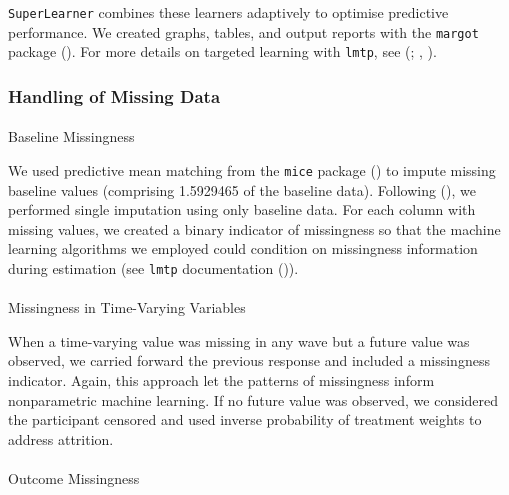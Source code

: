 \documentclass[
  single column]{article}
\makeatletter
\let\oldparagraph\paragraph
\renewcommand{\paragraph}{
    \@ifstar
      \xxxParagraphStar
      \xxxParagraphNoStar
  }
\newcommand{\xxxParagraphStar}[1]{\oldparagraph*{#1}\mbox{}}
\newcommand{\xxxParagraphNoStar}[1]{\oldparagraph{#1}\mbox{}}
\makeatother
\begin{document}
\texttt{SuperLearner} combines these learners adaptively to optimise
predictive performance. We created graphs, tables, and output reports
with the \texttt{margot} package (). For more details on targeted learning with \texttt{lmtp}, see
(;
,
).

\subsubsection{Handling of Missing Data}\label{handling-of-missing-data}

\paragraph{Baseline Missingness}\label{baseline-missingness}

We used predictive mean matching from the \texttt{mice} package
() to impute missing
baseline values (comprising 1.5929465 of the baseline data). Following
(), we performed single imputation using only baseline data. For
each column with missing values, we created a binary indicator of
missingness so that the machine learning algorithms we employed could
condition on missingness information during estimation (see
\texttt{lmtp} documentation ()).

\paragraph{Missingness in Time-Varying
Variables}\label{missingness-in-time-varying-variables}

When a time-varying value was missing in any wave but a future value was
observed, we carried forward the previous response and included a
missingness indicator. Again, this approach let the patterns of
missingness inform nonparametric machine learning. If no future value
was observed, we considered the participant censored and used inverse
probability of treatment weights to address attrition.

\paragraph{Outcome Missingness}\label{outcome-missingness}
\end{document}
